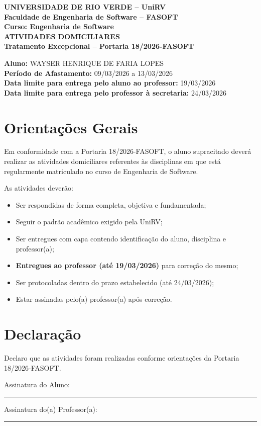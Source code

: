 \documentclass[12pt,a4paper]{article}
\begin{document}
\begin{center}
\textbf{\large UNIVERSIDADE DE RIO VERDE – UniRV}\\
\textbf{Faculdade de Engenharia de Software – FASOFT}\\[0.5cm]
\textbf{Curso: Engenharia de Software}\\[1cm]
 
\textbf{\Large ATIVIDADES DOMICILIARES}\\
\textbf{Tratamento Excepcional – Portaria 18/2026-FASOFT}\\[1cm]
\end{center}

\noindent
\textbf{Aluno:} WAYSER HENRIQUE DE FARIA LOPES\\
\textbf{Período de Afastamento:} 09/03/2026 a 13/03/2026\\
\textbf{Data limite para entrega pelo aluno ao professor:} 19/03/2026\\
\textbf{Data limite para entrega pelo professor à secretaria:} 24/03/2026\\


\section*{Orientações Gerais}

Em conformidade com a Portaria 18/2026-FASOFT, o aluno supracitado deverá realizar as atividades domiciliares referentes às disciplinas em que está regularmente matriculado no curso de Engenharia de Software.

As atividades deverão:

\begin{itemize}
    \item Ser respondidas de forma completa, objetiva e fundamentada;
    \item Seguir o padrão acadêmico exigido pela UniRV;
    \item Ser entregues com capa contendo identificação do aluno, disciplina e professor(a);
    \item \textbf{Entregues ao professor (até 19/03/2026)} para correção do mesmo;
    \item Ser protocoladas dentro do prazo estabelecido (até 24/03/2026);
    \item Estar assinadas pelo(a) professor(a) após correção.
\end{itemize}

\section*{Declaração}

Declaro que as atividades foram realizadas conforme orientações da Portaria 18/2026-FASOFT.


\noindent
Assinatura do Aluno: \rule{8cm}{0.4pt}

\vspace{1cm}

\noindent
Assinatura do(a) Professor(a): \rule{8cm}{0.4pt}
\end{document}
